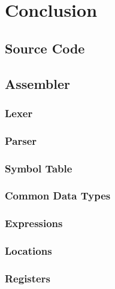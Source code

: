 \documentclass[a4paper,11pt]{report}
\begin{document}
\chapter*{Conclusion}
\nocite{*}


\begin{appendices}
\noappendicestocpagenum
\addappheadtotoc 
\chapter{Source Code}
\section{Assembler}\label{source:assembler}
\subsection{Lexer}\label{source:lexer}

\subsection{Parser}\label{source:parser}

\subsection{Symbol Table}\label{source:SymbolTable}

\subsection{Common Data Types}\label{source:DataTypes}

\subsection{Expressions}\label{source:Expressions}

\subsection{Locations}\label{source:locations}

\subsection{Registers}\label{source:registers}


\end{appendices}
\end{document}
